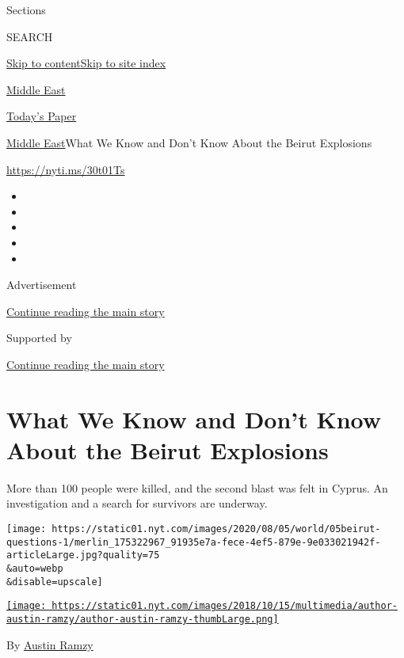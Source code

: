 Sections

SEARCH

\protect\hyperlink{site-content}{Skip to
content}\protect\hyperlink{site-index}{Skip to site index}

\href{https://www.nytimes.com/section/world/middleeast}{Middle East}

\href{https://myaccount.nytimes.com/auth/login?response_type=cookie\&client_id=vi}{}

\href{https://www.nytimes.com/section/todayspaper}{Today's Paper}

\href{/section/world/middleeast}{Middle East}\textbar{}What We Know and
Don't Know About the Beirut Explosions

\url{https://nyti.ms/30t01Ts}

\begin{itemize}
\item
\item
\item
\item
\item
\end{itemize}

Advertisement

\protect\hyperlink{after-top}{Continue reading the main story}

Supported by

\protect\hyperlink{after-sponsor}{Continue reading the main story}

\hypertarget{what-we-know-and-dont-know-about-the-beirut-explosions}{%
\section{What We Know and Don't Know About the Beirut
Explosions}\label{what-we-know-and-dont-know-about-the-beirut-explosions}}

More than 100 people were killed, and the second blast was felt in
Cyprus. An investigation and a search for survivors are underway.

\texttt{[image: https://static01.nyt.com/images/2020/08/05/world/05beirut-questions-1/merlin\_175322967\_91935e7a-fece-4ef5-879e-9e033021942f-articleLarge.jpg?quality=75\\\&auto=webp\\\&disable=upscale]}

\href{https://www.nytimes.com/by/austin-ramzy}{\texttt{[image: https://static01.nyt.com/images/2018/10/15/multimedia/author-austin-ramzy/author-austin-ramzy-thumbLarge.png]}}

By \href{https://www.nytimes.com/by/austin-ramzy}{Austin Ramzy}

